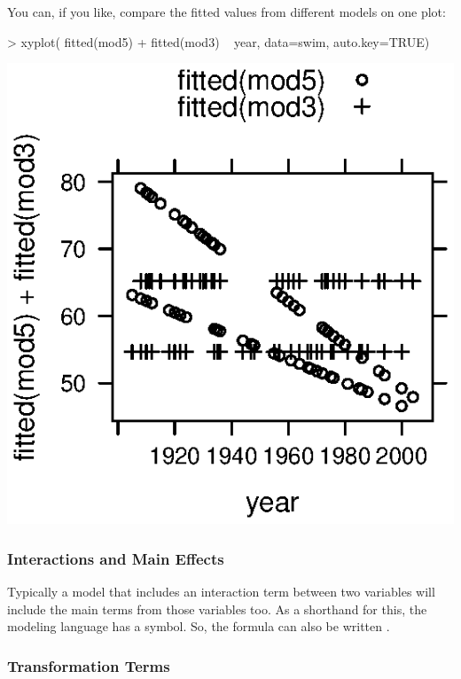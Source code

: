 You can, if you like, compare the fitted values from different models
on one plot:
\begin{Schunk}
\begin{Sinput}
> xyplot( fitted(mod5) + fitted(mod3) ~ year, data=swim, 
    auto.key=TRUE)
\end{Sinput}
\end{Schunk}
\includegraphics{Figures/language-fitted2}



\subsubsection{Interactions and Main Effects}

Typically a model that includes an interaction term between two
variables will include the
main terms from those variables too.  As a shorthand for this, the
modeling language has a \code{*} symbol.  So, the formula
 can also be written 
.

\subsubsection{Transformation Terms}

